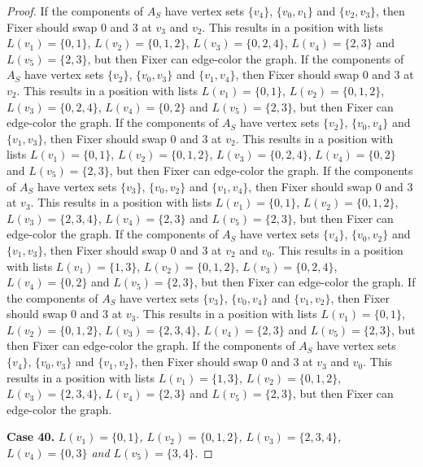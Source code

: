 \documentclass[12pt]{amsart}
\theoremstyle{plain}
\theoremstyle{definition}
\theoremstyle{remark}
\begin{document}
\begin{proof}
If the components of $A_S$ have vertex sets $\{v_4\}$, $\{v_0, v_1\}$ and $\{v_2, v_3\}$, then Fixer should swap 0 and 3 at $v_3$ and $v_2$. This results in a position with lists $L(v_1) = \{0, 1\}$, $L(v_2) = \{0, 1, 2\}$, $L(v_3) = \{0, 2, 4\}$, $L(v_4) = \{2, 3\}$ and $L(v_5) = \{2, 3\}$, but then Fixer can edge-color the graph.
If the components of $A_S$ have vertex sets $\{v_2\}$, $\{v_0, v_3\}$ and $\{v_1, v_4\}$, then Fixer should swap 0 and 3 at $v_2$. This results in a position with lists $L(v_1) = \{0, 1\}$, $L(v_2) = \{0, 1, 2\}$, $L(v_3) = \{0, 2, 4\}$, $L(v_4) = \{0, 2\}$ and $L(v_5) = \{2, 3\}$, but then Fixer can edge-color the graph.
If the components of $A_S$ have vertex sets $\{v_2\}$, $\{v_0, v_4\}$ and $\{v_1, v_3\}$, then Fixer should swap 0 and 3 at $v_2$. This results in a position with lists $L(v_1) = \{0, 1\}$, $L(v_2) = \{0, 1, 2\}$, $L(v_3) = \{0, 2, 4\}$, $L(v_4) = \{0, 2\}$ and $L(v_5) = \{2, 3\}$, but then Fixer can edge-color the graph.
If the components of $A_S$ have vertex sets $\{v_3\}$, $\{v_0, v_2\}$ and $\{v_1, v_4\}$, then Fixer should swap 0 and 3 at $v_3$. This results in a position with lists $L(v_1) = \{0, 1\}$, $L(v_2) = \{0, 1, 2\}$, $L(v_3) = \{2, 3, 4\}$, $L(v_4) = \{2, 3\}$ and $L(v_5) = \{2, 3\}$, but then Fixer can edge-color the graph.
If the components of $A_S$ have vertex sets $\{v_4\}$, $\{v_0, v_2\}$ and $\{v_1, v_3\}$, then Fixer should swap 0 and 3 at $v_2$ and $v_0$. This results in a position with lists $L(v_1) = \{1, 3\}$, $L(v_2) = \{0, 1, 2\}$, $L(v_3) = \{0, 2, 4\}$, $L(v_4) = \{0, 2\}$ and $L(v_5) = \{2, 3\}$, but then Fixer can edge-color the graph.
If the components of $A_S$ have vertex sets $\{v_3\}$, $\{v_0, v_4\}$ and $\{v_1, v_2\}$, then Fixer should swap 0 and 3 at $v_3$. This results in a position with lists $L(v_1) = \{0, 1\}$, $L(v_2) = \{0, 1, 2\}$, $L(v_3) = \{2, 3, 4\}$, $L(v_4) = \{2, 3\}$ and $L(v_5) = \{2, 3\}$, but then Fixer can edge-color the graph.
If the components of $A_S$ have vertex sets $\{v_4\}$, $\{v_0, v_3\}$ and $\{v_1, v_2\}$, then Fixer should swap 0 and 3 at $v_3$ and $v_0$. This results in a position with lists $L(v_1) = \{1, 3\}$, $L(v_2) = \{0, 1, 2\}$, $L(v_3) = \{2, 3, 4\}$, $L(v_4) = \{2, 3\}$ and $L(v_5) = \{2, 3\}$, but then Fixer can edge-color the graph.

\noindent\textbf{Case 40.  }\textit{$L(v_1) = \{0, 1\}$, $L(v_2) = \{0, 1, 2\}$, $L(v_3) = \{2, 3, 4\}$, $L(v_4) = \{0, 3\}$ and $L(v_5) = \{3, 4\}$.}


\end{proof}
\end{document}
